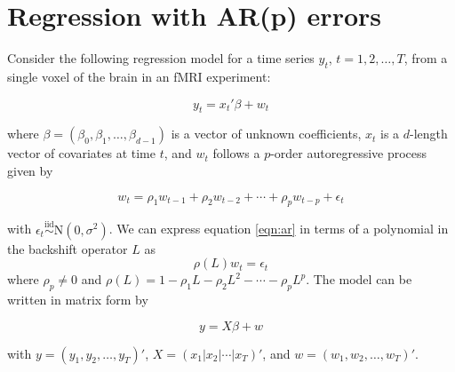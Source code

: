 \documentclass{article}
\begin{document}
\section{Regression with AR(p) errors} \label{sec:model}

Consider the following regression model for a time series $y_t$, $t = 1,2,\ldots,T$, from a single voxel of the brain in an fMRI experiment:

\begin{equation}
y_t = x_t'\beta + w_t \label{eqn:reg}
\end{equation}

\noindent where $\beta = (\beta_0,\beta_1,\ldots,\beta_{d-1})$ is a vector of unknown coefficients, $x_t$ is a $d$-length vector of covariates at time $t$, and $w_t$ follows a $p$-order autoregressive process given by

\begin{equation}
w_t = \rho_1 w_{t-1} + \rho_2 w_{t-2} + \cdots + \rho_p w_{t-p} + \epsilon_t \label{eqn:ar}
\end{equation}

\noindent with $\epsilon_t \stackrel{\mbox{iid}}{\sim} \mbox{N}(0, \sigma^2)$. We can express equation \eqref{eqn:ar} in terms of a polynomial in the backshift operator $L$ as \[\rho(L)w_t = \epsilon_t\] where $\rho_p \ne 0$ and $\rho(L) = 1 - \rho_1L - \rho_2L^2 - \cdots - \rho_pL^p$. The model can be written in matrix form by

\begin{equation}
y = X\beta + w \label{eqn:matrix}
\end{equation}

\noindent with $y = (y_1,y_2,\ldots,y_T)'$, $X = (x_1|x_2|\cdots|x_T)'$, and $w = (w_1,w_2,\ldots,w_T)'$.
\end{document}
